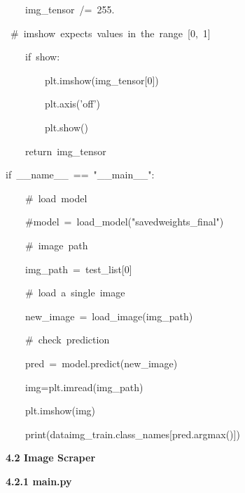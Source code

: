\documentclass[10pt]{article} %
\begin{document}
\begin{spacing}{1.5}
\noindent ~~~~img\_tensor~/=~255.~~~~~~~~~~~~~~~~~~~~~~~~~~~~~~~~~~~~~

\noindent ~\#~imshow~expects~values~in~the~range~[0,~1]

\noindent 

\noindent ~~~~if~show:

\noindent ~~~~~~~~plt.imshow(img\_tensor[0])~~~~~~~~~~~~~~~~~~~~~~~~~~~

\noindent ~~~~~~~~plt.axis('off')

\noindent ~~~~~~~~plt.show()

\noindent 

\noindent ~~~~return~img\_tensor

\noindent 

\noindent if~\_\_name\_\_~==~"\_\_main\_\_":

\noindent 

\noindent ~~~~\#~load~model

\noindent ~~~~\#model~=~load\_model("savedweights\_final")

\noindent 

\noindent ~~~~\#~image~path

\noindent ~~~~img\_path~=~test\_list[0]

\noindent ~~~~\#~load~a~single~image

\noindent ~~~~new\_image~=~load\_image(img\_path)

\noindent 

\noindent ~~~~\#~check~prediction

\noindent ~~~~pred~=~model.predict(new\_image)

\noindent ~~~~img=plt.imread(img\_path)

\noindent ~~~~plt.imshow(img)

\noindent ~~~~print(dataimg\_train.class\_names[pred.argmax()])

\vspace{2mm}
\noindent \textbf{\large 4.2 Image Scraper}

\vspace{2mm}
\noindent \textbf{4.2.1 main.py}


\end{spacing}
\end{document}
